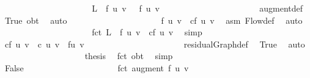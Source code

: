 {\ \ \ \ \ \ \ \ \ \ \ \ \ \ \ \ \ \ \isamarkupfalse%
\ \isamarkupfalse%
\ {\isachardoublequoteopen}{\isacharquery}L\ {\isasymle}\ f\ {\isacharparenleft}u{\isacharcomma}\ v{\isacharparenright}\ \ {\isacharplus}\ f{\isacharprime}\ {\isacharparenleft}u{\isacharcomma}\ v{\isacharparenright}{\isachardoublequoteclose}\ \isanewline
\ \ \ \ \ \ \ \ \ \ \ \ \ \ \ \ \ \ \ \ \isamarkupfalse%
\ augment{\isacharunderscore}def\ \isamarkupfalse%
\ True\ obt\ \isamarkupfalse%
\ auto\isanewline
\ \ \ \ \ \ \ \ \ \ \ \ \ \ \ \ \ \ \isamarkupfalse%
\ \isamarkupfalse%
\ {\isachardoublequoteopen}f{\isacharprime}\ {\isacharparenleft}u{\isacharcomma}\ v{\isacharparenright}\ {\isasymle}\ cf\ {\isacharparenleft}u{\isacharcomma}\ v{\isacharparenright}{\isachardoublequoteclose}\ \isamarkupfalse%
\ asm\ Flow{\isacharunderscore}def\ \isamarkupfalse%
\ auto\isanewline
\ \ \ \ \ \ \ \ \ \ \ \ \ \ \ \ \ \ \isamarkupfalse%
\ \isamarkupfalse%
\ fct{\isacharcolon}\ {\isachardoublequoteopen}{\isacharquery}L\ {\isasymle}\ f\ {\isacharparenleft}u{\isacharcomma}\ v{\isacharparenright}\ {\isacharplus}\ cf\ {\isacharparenleft}u{\isacharcomma}\ v{\isacharparenright}{\isachardoublequoteclose}\ \isamarkupfalse%
\ simp\isanewline
\ \ \ \ \ \ \ \ \ \ \ \ \ \ \ \ \ \ \isamarkupfalse%
\ {\isachardoublequoteopen}cf\ {\isacharparenleft}u{\isacharcomma}\ v{\isacharparenright}\ {\isacharequal}\ c\ {\isacharparenleft}u{\isacharcomma}\ v{\isacharparenright}\ {\isacharminus}\ f{\isacharparenleft}u{\isacharcomma}\ v{\isacharparenright}{\isachardoublequoteclose}\ \isanewline
\ \ \ \ \ \ \ \ \ \ \ \ \ \ \ \ \ \ \ \ \isamarkupfalse%
\ residualGraph{\isacharunderscore}def\ \isamarkupfalse%
\ True\ \isamarkupfalse%
\ auto\isanewline
\ \ \ \ \ \ \ \ \ \ \ \ \ \ \ \ \ \ \isamarkupfalse%
\ {\isacharquery}thesis\ \isamarkupfalse%
\ fct\ obt\ \isamarkupfalse%
\ simp\isanewline
\ \ \ \ \ \ \ \ \ \ \ \ \ \ \isamarkupfalse%
\isanewline
\ \ \ \ \ \ \ \ \ \ \ \ \ \ \ \ \isamarkupfalse%
\ False\isanewline
\ \ \ \ \ \ \ \ \ \ \ \ \ \ \ \ \ \ \isamarkupfalse%
\ \isamarkupfalse%
\ fct{\isacharcolon}\ {\isachardoublequoteopen}augment\ f{\isacharprime}\ {\isacharparenleft}u{\isacharcomma}\ v{\isacharparenright}\ {\isacharequal}\ {}{\isachardoublequoteclose}\ \isamarkupfalse%
}

